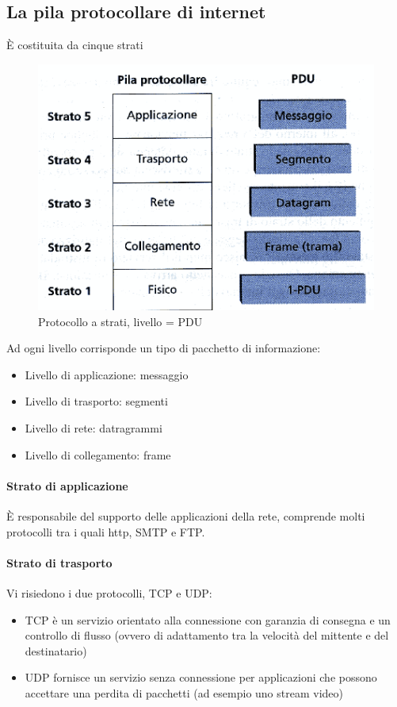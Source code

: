\documentclass[11pt,a4paper]{book}
\begin{document}
\subsection{La pila protocollare di internet}
È costituita da cinque strati

\begin{figure}
	\begin{center}
		\includegraphics[scale=1]{img/008.png}
		\caption{Protocollo a strati, livello = PDU}
	\end{center} 
\end{figure}
Ad ogni livello corrisponde un tipo di pacchetto di informazione:
\begin{itemize}
	\item Livello di applicazione: messaggio
	\item Livello di trasporto: segmenti
	\item Livello di rete: datragrammi
	\item Livello di collegamento: frame
\end{itemize}
\paragraph{Strato di applicazione}
È responsabile del supporto delle applicazioni della rete, comprende molti protocolli tra i quali http, SMTP e FTP.
\paragraph{Strato di trasporto}
Vi risiedono i due protocolli, TCP e UDP:
\begin{itemize}
	\item TCP è un servizio orientato alla connessione con garanzia di consegna e un controllo di flusso (ovvero di adattamento tra la velocità del mittente e del destinatario)
	\item UDP fornisce un servizio senza connessione per applicazioni che possono accettare una perdita di pacchetti (ad esempio uno stream video)
\end{itemize}
\end{document}
